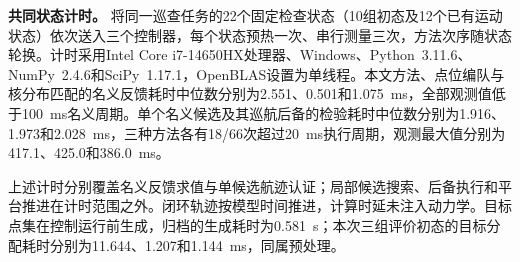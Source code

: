 \documentclass[UTF8,a4paper,11pt,fontset=none]{ctexart}
\begin{document}
\smallskip\noindent\textbf{共同状态计时。}
将同一巡查任务的22个固定检查状态（10组初态及12个已有运动状态）依次送入三个控制器，每个状态预热一次、串行测量三次，方法次序随状态轮换。计时采用Intel Core i7-14650HX处理器、Windows、Python~3.11.6、NumPy~2.4.6和SciPy~1.17.1，OpenBLAS设置为单线程。本文方法、点位编队与核分布匹配的名义反馈耗时中位数分别为2.551、0.501和1.075~ms，全部观测值低于100~ms名义周期。单个名义候选及其巡航后备的检验耗时中位数分别为1.916、1.973和2.028~ms，三种方法各有18/66次超过20~ms执行周期，观测最大值分别为417.1、425.0和386.0~ms。

上述计时分别覆盖名义反馈求值与单候选航迹认证；局部候选搜索、后备执行和平台推进在计时范围之外。闭环轨迹按模型时间推进，计算时延未注入动力学。目标点集在控制运行前生成，归档的生成耗时为0.581~s；本次三组评价初态的目标分配耗时分别为11.644、1.207和1.144~ms，同属预处理。
\FloatBarrier
\end{document}
